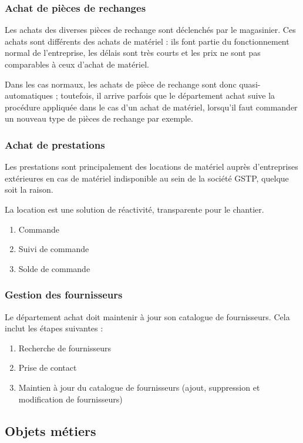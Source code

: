 \documentclass[twoside]{article}
\begin{document}
\subsubsection{Achat de pièces de rechanges}

Les achats des diverses pièces de rechange sont déclenchés
par le magasinier.
Ces achats sont différents des achats de matériel : ils font partie du
fonctionnement normal de l'entreprise, les délais sont très courts et les
prix ne sont pas comparables à ceux d'achat de matériel.

Dans les cas normaux, les achats de pièce de rechange sont donc
quasi-automatiques ; toutefois, il arrive parfois que le département achat
suive la procédure appliquée dans le cas d'un achat de matériel, lorsqu'il
faut commander un nouveau type de pièces de rechange par exemple.


\subsubsection{Achat de prestations}

Les prestations sont principalement des locations de matériel auprès
d'entreprises extérieures en cas de matériel indisponible au sein de la
société GSTP, quelque soit la raison.

La location est une solution de réactivité, transparente pour le chantier.

\begin{enumerate}
\item Commande 
\item Suivi de commande
\item Solde de commande
\end{enumerate}


\subsubsection{Gestion des fournisseurs}

Le département achat doit maintenir à jour son catalogue de fournisseurs.
Cela inclut les étapes suivantes :
\begin{enumerate}
\item Recherche de fournisseurs
\item Prise de contact
\item Maintien à jour du catalogue de fournisseurs (ajout, suppression et
        modification de fournisseurs)
\end{enumerate}


\subsection{Objets métiers}
\end{document}
